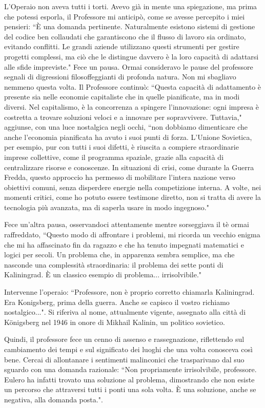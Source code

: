 \documentclass[12pt,b5paper]{article}
\begin{document}
L'Operaio non aveva tutti i torti. Avevo già in mente una spiegazione, ma prima
che potessi esporla, il Professore mi anticipò, come se avesse percepito i miei
pensieri: ``È una domanda pertinente. Naturalmente esistono sistemi
di gestione del codice ben collaudati che garantiscono che il flusso di lavoro
sia ordinato, evitando conflitti. Le grandi aziende utilizzano questi strumenti
per gestire progetti complessi, ma ciò che le distingue davvero è la loro
capacità di adattarsi alle sfide impreviste." Fece un pausa. Ormai
consideravo le pause del professore segnali di digressioni filosoffeggianti di
profonda natura. Non mi sbagliavo nemmeno questa volta. Il Professore continuò:
``Questa capacità di adattamento è presente sia nelle economie capitaliste che
in quelle pianificate, ma in modi diversi. Nel capitalismo, è la concorrenza a
spingere l'innovazione: ogni impresa è costretta a trovare soluzioni veloci e a
innovare per sopravvivere. Tuttavia," aggiunse, con una luce nostalgica negli 
occhi, ``non dobbiamo dimenticare che anche l'economia pianificata ha avuto i
suoi punti di forza. L'Unione Sovietica, per esempio, pur con tutti i suoi
difetti, è riuscita a compiere straordinarie imprese collettive, come il
programma spaziale, grazie alla capacità di centralizzare risorse e conoscenze.
In situazioni di crisi, come durante la Guerra Fredda, questo approccio ha
permesso di mobilitare l'intera nazione verso obiettivi comuni, senza disperdere
energie nella competizione interna. A volte, nei momenti critici, come ho potuto
essere  testimone diretto, non si tratta di avere la tecnologia più avanzata,
ma di saperla usare in modo ingegnoso." 
 
Fece un'altra pausa, osservandoci attentamente mentre sorseggiava il tè ormai
raffreddato, ``Questo modo di affrontare i problemi, mi ricorda un vecchio
enigma che mi ha affascinato fin da ragazzo e che ha tenuto impegnati
matematici e logici per secoli. Un problema che, in apparenza sembra semplice,
ma che nasconde una complessità straordinaria: il problema dei sette ponti di
Kaliningrad. È un classico esempio di problema... irrisolvibile."

Intervenne l'operaio: ``Professore, non è proprio corretto chiamarla Kaliningrad.
Era Konigsberg, prima della guerra. Anche se capisco il vostro richiamo 
nostalgico...".  Si riferiva al nome, attualmente vigente, assegnato alla città di
Königsberg nel 1946 in onore di Mikhail Kalinin, un politico sovietico.

Quindi, il professore fece un cenno di assenso e rassegnazione, riflettendo sul cambiamento dei tempi e sul significato dei luoghi che una volta conosceva così bene. Cercai di allontanare i sentimenti malinconici che trasparivano dal
suo sguardo con una domanda razionale: ``Non propriamente irrisolvibile,
professore. Eulero ha infatti trovato una soluzione al problema, dimostrando che
non esiste un percorso che attraversi tutti i ponti una sola volta. È una
soluzione, anche se negativa, alla domanda posta.".
\end{document}
